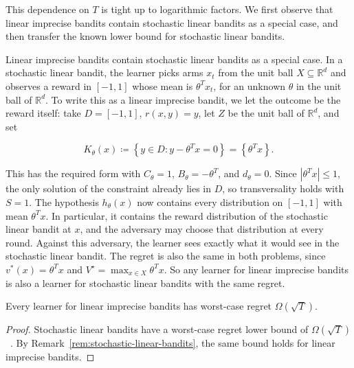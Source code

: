 This dependence on $T$ is tight up to logarithmic factors. We first observe that
linear imprecise bandits contain stochastic linear bandits as a special case, and then
transfer the known lower bound for stochastic linear bandits.

\begin{remark}\label{rem:stochastic-linear-bandits}
Linear imprecise bandits contain stochastic linear bandits as a special case. In a
stochastic linear bandit, the learner picks arms $x_{t}$ from the unit ball
$X \subseteq \mathbb{R}^{d}$ and observes a reward in $\left[ - 1 , 1 \right]$ whose mean is
$\theta^{T} x_{t}$, for an unknown $\theta$ in the unit ball of $\mathbb{R}^{d}$. To write
this as a linear imprecise bandit, we let the outcome be the reward itself:
take $D = \left[ - 1 , 1 \right]$, $r \left( x , y \right) = y$, let $Z$ be the unit ball of $\mathbb{R}^{d}$,
and set


\begin{equation*}
K_{\theta} \left( x \right) \coloneqq \left\{ y \in D : y - \theta^{T} x = 0 \right\} = \left\{ \theta^{T} x \right\} .
\end{equation*}


This has the required form with $C_{\theta} = 1$, $B_{\theta} = - \theta^{T}$, and
$d_{\theta} = 0$. Since $\left| \theta^{T} x \right| \le 1$, the only solution of the constraint
already lies in $D$, so transversality holds with $S = 1$. The hypothesis
$h_{\theta} \left( x \right)$ now contains every distribution on $\left[ - 1 , 1 \right]$ with mean $\theta^{T} x$.
In particular, it contains the reward distribution of the stochastic linear
bandit at $x$, and the adversary may choose that distribution at every round.
Against this adversary, the learner sees exactly what it would see in the
stochastic linear bandit. The regret is also the same in both problems, since
$v^{\ast} \left( x \right) = \theta^{T} x$ and $V^{\star} = \operatorname*{max}_{x \in X} \theta^{T} x$. So any learner for linear
imprecise bandits is also a learner for stochastic linear bandits with the
same regret.
\end{remark}
{
\begin{theorem}\label{thm:lower-bound-informal}
Every learner for linear imprecise bandits has worst-case regret $\Omega \left( \sqrt{T} \right)$.
\end{theorem}

\begin{proof}
Stochastic linear bandits have a worst-case regret lower bound of
$\Omega \left( \sqrt{T} \right)$~\citep{dani2008stochastic}. By
Remark~\ref{rem:stochastic-linear-bandits}, the same bound holds for linear imprecise bandits.
\end{proof}
}

